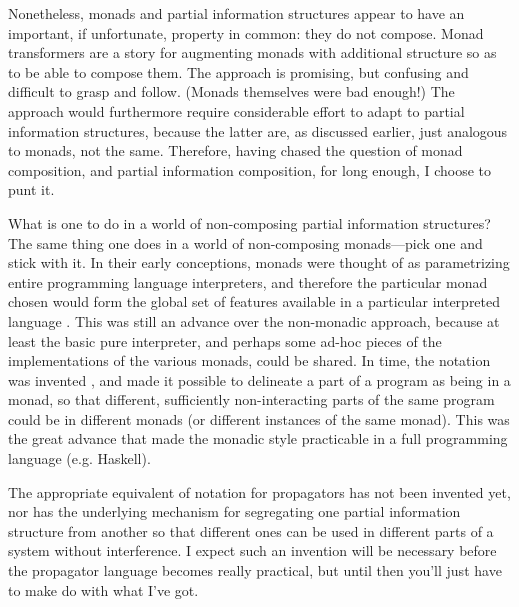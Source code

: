 \documentclass[12pt,letterpaper]{article}
\begin{document}
Nonetheless, monads and partial information structures appear to have
an important, if unfortunate, property in common: they do not compose.
Monad transformers \cite{?} are a story for augmenting monads with
additional structure so as to be able to compose them.  The approach
is promising, but confusing and difficult to grasp and follow.
(Monads themselves were bad enough!)  The approach would furthermore
require considerable effort to adapt to partial information
structures, because the latter are, as discussed earlier, just
analogous to monads, not the same.  Therefore, having chased the
question of monad composition, and partial information composition,
for long enough, I choose to punt it.

What is one to do in a world of non-composing partial information
structures?  The same thing one does in a world of non-composing
monads---pick one and stick with it.  In their early
conceptions,\cite{wadler?, moggi?}  monads were thought of as parametrizing
entire programming language interpreters, and therefore the particular
monad chosen would form the global set of features available in a
particular interpreted language .  This was still an advance over the non-monadic approach,
because at least the basic pure interpreter, and perhaps some ad-hoc
pieces of the implementations of the various monads, could be shared.
In time, the  notation was invented \cite{??}, and made it
possible to delineate a part of a program as being in a monad, so that
different, sufficiently non-interacting parts of the same program
could be in different monads (or different instances of the same
monad).  This was the great advance that made the monadic style
practicable in a full programming language (e.g. Haskell).

The appropriate equivalent of  notation for propagators has
not been invented yet, nor has the underlying mechanism for
segregating one partial information structure from another so that
different ones can be used in different parts of a system without
interference.  I expect such an invention will be necessary before the
propagator language becomes really practical, but until then you'll
just have to make do with what I've got.
\end{document}
